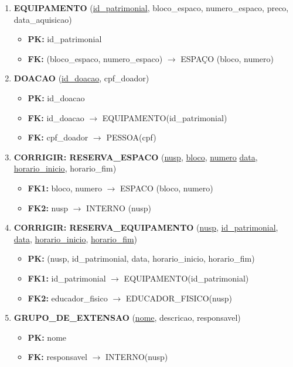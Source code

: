 \documentclass{article}
\begin{document}
\begin{enumerate}
    \item \textbf{EQUIPAMENTO} (\underline{id\_patrimonial}, bloco\_espaco, numero\_espaco, preco, data\_aquisicao)
        \begin{itemize}
            \item \textbf{PK:} id\_patrimonial
            \item \textbf{FK:} (bloco\_espaco, numero\_espaco) $\rightarrow$ ESPAÇO (bloco, numero)
        \end{itemize}
        
    \item \textbf{DOACAO} (\underline{id\_doacao}, cpf\_doador)
        \begin{itemize}
            \item \textbf{PK:} id\_doacao
            \item \textbf{FK:} id\_doacao $\rightarrow$ EQUIPAMENTO(id\_patrimonial)
            \item \textbf{FK:} cpf\_doador $\rightarrow$ PESSOA(cpf)
        \end{itemize}

    \item \textbf{CORRIGIR: RESERVA\_ESPACO} (\underline{nusp}, \underline{bloco}, \underline{numero} \underline{data}, \underline{horario\_inicio}, horario\_fim)
         \begin{itemize}
            \item \textbf{FK1:} bloco, numero $\rightarrow$ ESPACO (bloco, numero)
            \item \textbf{FK2:} nusp $\rightarrow$ INTERNO (nusp)
        \end{itemize}
        
    \item \textbf{CORRIGIR: RESERVA\_EQUIPAMENTO} (\underline{nusp}, \underline{id\_patrimonial}, \underline{data}, \underline{horario\_inicio}, \underline{horario\_fim})
        \begin{itemize}
            \item \textbf{PK:} (nusp, id\_patrimonial, data, horario\_inicio, horario\_fim)
            \item \textbf{FK1:} id\_patrimonial $\rightarrow$ EQUIPAMENTO(id\_patrimonial)
            \item \textbf{FK2:} educador\_fisico $\rightarrow$ EDUCADOR\_FISICO(nusp)
        \end{itemize}

    \item \textbf{GRUPO\_DE\_EXTENSAO} (\underline{nome}, descricao, responsavel)
        \begin{itemize}
            \item \textbf{PK:} nome
            \item \textbf{FK:} responsavel $\rightarrow$ INTERNO(nusp)
        \end{itemize}


\end{enumerate}
\end{document}
